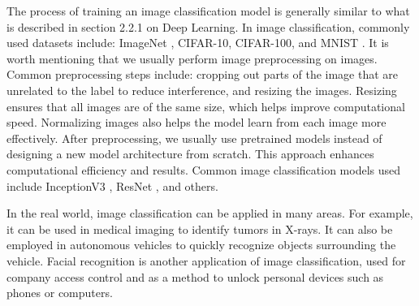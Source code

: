 \begin{ZhChapter}
    The process of training an image classification model is generally similar to what is described in section 2.2.1 on Deep Learning. In image classification, commonly used datasets include: ImageNet \cite{5206848}, CIFAR-10, CIFAR-100, and MNIST \cite{deng2012mnist}. It is worth mentioning that we usually perform image preprocessing on images. Common preprocessing steps include: cropping out parts of the image that are unrelated to the label to reduce interference, and resizing the images. Resizing ensures that all images are of the same size, which helps improve computational speed. Normalizing images also helps the model learn from each image more effectively. After preprocessing, we usually use pretrained models instead of designing a new model architecture from scratch. This approach enhances computational efficiency and results. Common image classification models used include InceptionV3 \cite{szegedy2015rethinkinginceptionarchitecturecomputer}, ResNet \cite{he2015deepresiduallearningimage}, and others.

    In the real world, image classification can be applied in many areas. For example, it can be used in medical imaging to identify tumors in X-rays. It can also be employed in autonomous vehicles to quickly recognize objects surrounding the vehicle. Facial recognition is another application of image classification, used for company access control and as a method to unlock personal devices such as phones or computers.



\end{ZhChapter}
